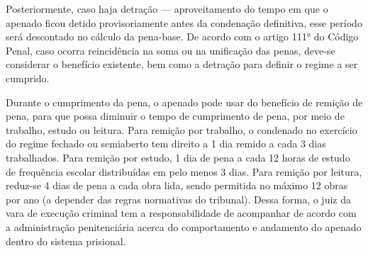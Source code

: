 Posteriormente, caso haja detração — aproveitamento do tempo em que o apenado ficou detido provisoriamente antes da condenação definitiva, esse período será descontado no cálculo da pena-base. De acordo com o artigo 111° do Código Penal, caso ocorra reincidência na soma ou na unificação das penas, deve-se considerar o benefício existente, bem como a detração para definir o regime a ser cumprido.\cite{lep}

Durante o cumprimento da pena, o apenado pode usar do benefício de remição de pena, para que possa diminuir o tempo de cumprimento de pena, por meio de trabalho, estudo ou leitura.  Para remição por trabalho, o condenado no exercício do regime fechado ou semiaberto tem direito a 1 dia remido a cada 3 dias trabalhados. Para remição por estudo, 1 dia de pena a cada 12 horas de estudo de frequência escolar distribuídas em pelo menos 3 dias. Para remição por leitura, reduz-se 4 dias de pena a cada obra lida, sendo permitida no máximo 12 obras por ano (a depender das regras  normativas do tribunal). Dessa forma, o juiz da vara de execução criminal tem a responsabilidade de acompanhar de acordo com a administração penitenciária acerca do comportamento e andamento do apenado dentro do sistema prisional.\cite{lep}

